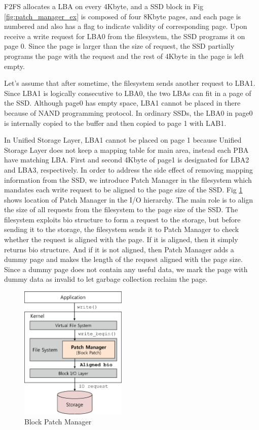 \documentclass[letterpaper,twocolumn,10pt]{article}
\begin{document}
F2FS allocates a LBA on every 4Kbyte, and a SSD block in Fig \ref{fig:patch_manager_ex} is composed of four 8Kbyte pages, and each page is numbered and also has a flag to indicate validity of corresponding page. Upon receive a write request for LBA0 from the filesystem, the SSD programs it on page 0. Since the page is larger than the size of request, the SSD partially programs the page with the request and the rest of 4Kbyte in the page is left empty.

Let’s assume that after sometime, the filesystem sends another request to LBA1. Since LBA1 is logically consecutive to LBA0, the two LBAs can fit in a page of the SSD. Although page0 has empty space, LBA1 cannot be placed in there because of NAND programming protocol. In ordinary SSDs, the LBA0 in page0 is internally copied to the buffer and then copied to page 1 with LAB1.

In Unified Storage Layer, LBA1 cannot be placed on page 1 because Unified Storage Layer does not keep a mapping table for main area, instead each PBA have matching LBA. First and second 4Kbyte of page1 is designated for LBA2 and LBA3, respectively. In order to address the side effect of removing mapping information from the SSD, we introduce Patch Manager in the filesystem which mandates each write request to be aligned to the page size of the SSD. Fig \ref{fig:patch_manager} shows location of Patch Manager in the I/O hierarchy. The main role is to align the size of all requests from the filesystem to the page size of the SSD. The filesystem exploits bio structure to form a request to the storage, but before sending it to the storage, the filesystem sends it to Patch Manager to check whether the request is aligned with the page. If it is aligned, then it simply returns bio structure. And if it is not aligned, then Patch Manager adds a dummy page and makes the length of the request aligned with the page size. Since a dummy page does not contain any useful data, we mark the page with dummy data as invalid to let garbage collection reclaim the page.


\begin{figure}[h]
\begin{center}
\includegraphics[width=2in]{./figure/patch_manager}
\caption{Block Patch Manager}
\label{fig:patch_manager}
\end{center}
\end{figure}
\end{document}
